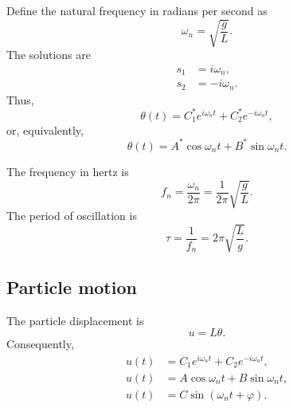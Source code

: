 Define the natural frequency in radians per second as
\begin{equation}
    \omega_n=\sqrt{\frac{g}{L}}.
    \tag{10}
\end{equation}
The solutions are
\begin{equation}
\begin{aligned}
    s_1 &= i\omega_n,\\
    s_2 &= -i\omega_n.
\end{aligned}
    \tag{11}
\end{equation}
Thus,
\begin{equation}
    \theta(t)=C_1^*e^{i\omega_nt}+C_2^*e^{-i\omega_nt},
    \tag{12}
\end{equation}
or, equivalently,
\begin{equation}
    \theta(t)=A^*\cos\omega_nt+B^*\sin\omega_nt.
    \tag{13}
\end{equation}

The frequency in hertz is
\begin{equation}
    f_n=\frac{\omega_n}{2\pi}=\frac{1}{2\pi}\sqrt{\frac{g}{L}}.
    \tag{14}
\end{equation}
The period of oscillation is
\begin{equation}
    \tau=\frac{1}{f_n}=2\pi\sqrt{\frac{L}{g}}.
    \tag{15}
\end{equation}

\subsection*{Particle motion}

The particle displacement is
\begin{equation*}
    u=L\theta.
\end{equation*}
Consequently,
\begin{align}
    u(t)&=C_1e^{i\omega_nt}+C_2e^{-i\omega_nt},
    \tag{16a}\\
    u(t)&=A\cos\omega_nt+B\sin\omega_nt,
    \tag{16b}\\
    u(t)&=C\sin(\omega_nt+\varphi).
    \tag{16c}
\end{align}
